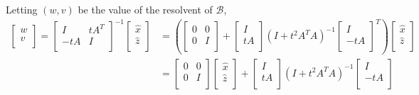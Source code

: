 \documentclass{article}
\theoremstyle{definition}
\theoremstyle{remark}
\begin{document}
Letting $(w, v)$ be the value of the resolvent of $\mathcal{B}$, 
\begin{align*}
  \begin{bmatrix}
    w \\
    v \\
  \end{bmatrix} 
  =
  {\begin{bmatrix}
    I & tA^T \\
    -tA & I \\
  \end{bmatrix}}^{-1}
  \begin{bmatrix}
    \hat{x} \\
    \hat{z} \\
  \end{bmatrix} 
  &= \left(
  \begin{bmatrix}
    0 & 0 \\
    0 & I \\
  \end{bmatrix} +
  \begin{bmatrix}
    I \\
    tA \\
  \end{bmatrix}
  {(I + t^2A^T A)}^{-1}
  {\begin{bmatrix}
    I \\
    -tA \\
  \end{bmatrix}}^T \right)
  \begin{bmatrix}
    \hat{x} \\
    \hat{z} \\
  \end{bmatrix}\\
  &= \begin{bmatrix}
    0 & 0 \\
    0 & I \\
  \end{bmatrix}
  \begin{bmatrix}
    \hat{x} \\
    \hat{z} \\
  \end{bmatrix}
  + 
  \begin{bmatrix}
    I \\
    tA \\
  \end{bmatrix}
  {(I + t^2A^T A)}^{-1}
  {\begin{bmatrix}
    I \\
    -tA \\

\end{bmatrix}}
\end{align*}
\end{document}
